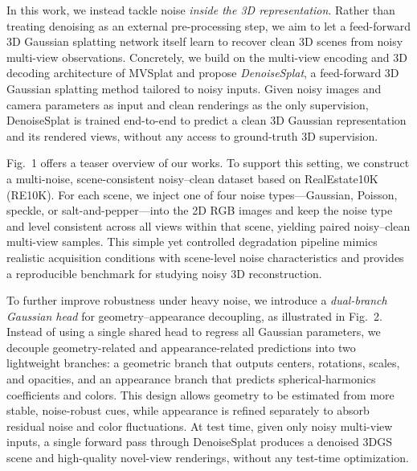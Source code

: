 In this work, we instead tackle noise \emph{inside the 3D representation}. Rather than treating denoising as an external pre-processing step, we aim to let a feed-forward 3D Gaussian splatting network itself learn to recover clean 3D scenes from noisy multi-view observations. Concretely, we build on the multi-view encoding and 3D decoding architecture of MVSplat and propose \emph{DenoiseSplat}, a feed-forward 3D Gaussian splatting method tailored to noisy inputs. Given noisy images and camera parameters as input and clean renderings as the only supervision, DenoiseSplat is trained end-to-end to predict a clean 3D Gaussian representation and its rendered views, without any access to ground-truth 3D supervision.

Fig.~1 offers a teaser overview of our works. To support this setting, we construct a multi-noise, scene-consistent noisy--clean dataset based on RealEstate10K (RE10K). For each scene, we inject one of four noise types---Gaussian, Poisson, speckle, or salt-and-pepper---into the 2D RGB images and keep the noise type and level consistent across all views within that scene, yielding paired noisy--clean multi-view samples. This simple yet controlled degradation pipeline mimics realistic acquisition conditions with scene-level noise characteristics and provides a reproducible benchmark for studying noisy 3D reconstruction.

To further improve robustness under heavy noise, we introduce a \emph{dual-branch Gaussian head} for geometry--appearance decoupling, as illustrated in Fig.~2. Instead of using a single shared head to regress all Gaussian parameters, we decouple geometry-related and appearance-related predictions into two lightweight branches: a geometric branch that outputs centers, rotations, scales, and opacities, and an appearance branch that predicts spherical-harmonics coefficients and colors. This design allows geometry to be estimated from more stable, noise-robust cues, while appearance is refined separately to absorb residual noise and color fluctuations. At test time, given only noisy multi-view inputs, a single forward pass through DenoiseSplat produces a denoised 3DGS scene and high-quality novel-view renderings, without any test-time optimization.

